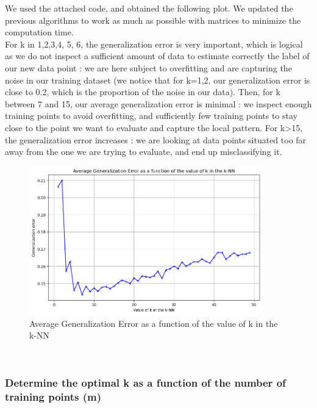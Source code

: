 \documentclass[final,3p,times,12pt]{article}
\begin{document}
\begin{enumerate}
        We used the attached code, and obtained the following plot. We updated the previous algorithms to work as much as possible with matrices to minimize the computation time.\\
        
        For k in {1,2,3,4, 5, 6}, the generalization error is very important, which is logical as we do not inspect a sufficient amount of data to estimate correctly the label of our new data point : we are here subject to overfitting and are capturing the noise in our training dataset (we notice that for k={1,2}, our generalization error is close to 0.2, which is the proportion of the noise in our data). Then, for k between 7 and 15, our average generalization error is minimal : we inspect enough training points to avoid overfitting, and sufficiently few training points to stay close to the point we want to evaluate and capture the local pattern. For k>15, the generalization error increases : we are looking at data points situated too far away from the one we are trying to evaluate, and end up misclassifying it.\\

        \begin{figure}[H] %
            \centering %
            \includegraphics[width=0.9\textwidth]{images/image_part2_2.png}
            \caption{Average Generalization Error as a function of the value of k in the k-NN} %
            \label{fig:image1} %
        \end{figure}\\

    \subsubsection{Determine the optimal k as a function of the number of training points (m)}
    

\end{enumerate}
\end{document}
